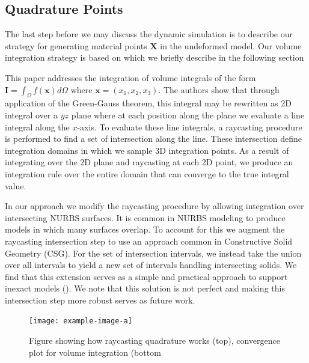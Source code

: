 \subsection{Quadrature Points}
The last step before we may discuss the dynamic simulation is to describe our strategy for generating material points $\mathbf{X}$ in the undeformed model. Our volume integration strategy is based on \cite{KHOSRAVIFARD201030} which we briefly describe in the following section

This paper addresses the integration of volume integrals of the form $\mathbf{I} = \int_\Omega f(\mathbf{x}) d\Omega$ where $\mathbf{x} = (x_1,x_2,x_3)$. The authors show that through application of the Green-Gauss theorem, this integral may be rewritten as 2D integral over a $yz$ plane where at each position along the plane we evaluate a line integral along the $x$-axis. To evaluate these line integrals, a raycasting procedure is performed to find a set of intersection along the line. These intersection define integration domains in which we sample 3D integration points. As a result of integrating over the 2D plane and raycasting at each 2D point, we produce an integration rule over the entire domain that can converge to the true integral value.

In our approach we modify the raycasting procedure by allowing integration over intersecting NURBS surfaces. It is common in NURBS modeling to produce models in which many surfaces overlap. To account for this we augment the raycasting intersection step to use an approach common in Constructive Solid Geometry (CSG). For the set of intersection intervals, we instead take the union over all intervals to yield a new set of intervals handling intersecting solids. We find that this extension serves as a simple and practical approach to support inexact models (). We note that this solution is not perfect and making this intersection step more robust serves as future work.

\begin{figure}
    \texttt{[image: example-image-a]}
    \caption{Figure showing how raycasting quadrature works (top), convergence plot for volume integration (bottom}
    \label{fig:raycasting}
\end{figure}


